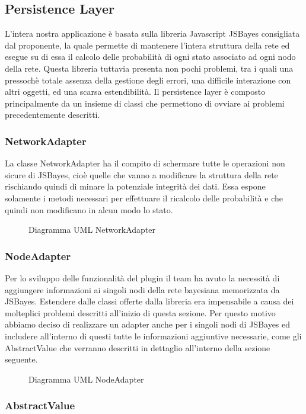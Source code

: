 \subsection{Persistence Layer}
L'intera nostra applicazione è basata sulla libreria Javascript JSBayes consigliata dal proponente, la quale permette di mantenere l'intera struttura della rete ed esegue su di essa il calcolo delle probabilità di ogni stato associato ad ogni nodo della rete.
Questa libreria tuttavia presenta non pochi problemi, tra i quali una pressochè totale assenza della gestione degli errori, una difficile interazione con altri oggetti, ed una scarsa estendibilità.
Il persistence layer è composto principalmente da un insieme di classi che permettono di ovviare ai problemi precedentemente descritti.
\subsubsection{NetworkAdapter}
La classe NetworkAdapter ha il compito di schermare tutte le operazioni non sicure di JSBayes, cioè quelle che vanno a modificare la struttura della rete rischiando quindi di minare la potenziale integrità dei dati.
Essa espone solamente i metodi necessari per effettuare il ricalcolo delle probabilità e che quindi non modificano in alcun modo lo stato.
\begin{figure} [H]
	\centering

	\caption{Diagramma UML NetworkAdapter}\label{}
\end{figure}
\subsubsection{NodeAdapter}
Per lo sviluppo delle funzionalità del plugin il team ha avuto la necessità di aggiungere informazioni ai singoli nodi della rete bayesiana memorizzata da JSBayes.
Estendere dalle classi offerte dalla libreria era impensabile a causa dei molteplici problemi descritti all'inizio di questa sezione. Per questo motivo abbiamo deciso di realizzare un adapter anche per i singoli nodi di JSBayes ed includere all'interno di questi tutte le informazioni aggiuntive necessarie, come gli AbstractValue che verranno descritti in dettaglio all'interno della sezione seguente.
\begin{figure} [H]
	\centering
	
	\caption{Diagramma UML NodeAdapter}\label{}
\end{figure}
\subsubsection{AbstractValue}

